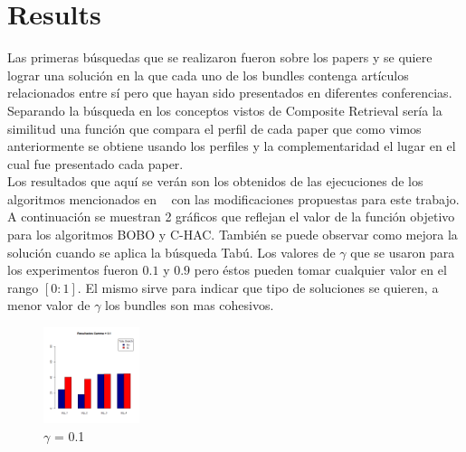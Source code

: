 \section{Results}
Las primeras búsquedas que se realizaron fueron sobre los papers y se quiere lograr una solución en la que cada uno de los bundles contenga artículos relacionados entre sí pero que hayan sido presentados en diferentes conferencias. Separando la búsqueda en los conceptos vistos de Composite Retrieval sería la similitud una función que compara el perfil de cada paper que como vimos anteriormente se obtiene usando los perfiles y la complementaridad el lugar en el cual fue presentado cada paper.\\
Los resultados que aquí se verán son los obtenidos de las ejecuciones de los algoritmos mencionados en ~\cite{compositeRetrival} con las modificaciones propuestas para este trabajo. A continuación se muestran 2 gráficos que reflejan el valor de la función objetivo para los algoritmos BOBO y C-HAC. También se puede observar como mejora la solución cuando se aplica la búsqueda Tabú. Los valores de $\gamma$ que se usaron para los experimentos fueron $0.1$ y $0.9$ pero éstos pueden tomar cualquier valor en el rango $[0:1]$. El mismo sirve para indicar que tipo de soluciones se quieren, a menor valor de $\gamma$ los bundles son mas cohesivos.
\begin{figure}[H]
	\centering
	\includegraphics[width=0.25\textwidth]{img/gamma01.png}
	\caption{$\gamma$ = 0.1}
	\label{res:img-gamma01-papers}
\end{figure}

